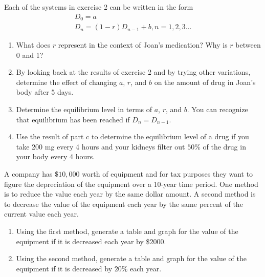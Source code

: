 \documentclass[10pt,]{book}
\theoremstyle{ptxdefinitionnotitle}
\theoremstyle{ptxdefinitiontitle}
\theoremstyle{ptxdefinitionnotitle}
\theoremstyle{ptxdefinitiontitle}
\theoremstyle{ptxdefinitionnotitle}
\theoremstyle{ptxdefinitiontitle}
\numberwithin{equation}{section}
\begin{document}
\begin{divisionexercise}{3}\hypertarget{exercise-5}{}
\hypertarget{p-23}{}%
Each of the systems in exercise 2 can be written in the form%
\begin{gather*}
D_0=a\\
D_n=(1-r) D_{n-1}+b, n=1,2,3...
\end{gather*}
\leavevmode%
\begin{enumerate}[label=(\alph*)]
\item\hypertarget{li-15}{}What does \(r\) represent in the context of Joan's medication?  Why is \(r\) between 0 and 1?%
\item\hypertarget{li-16}{}By looking back at the results of exercise 2 and by trying other variations, determine the effect of changing \(a\), \(r\), and \(b\) on the amount of drug in Joan's body after 5 days.%
\item\hypertarget{li-17}{}Determine the equilibrium level in terms of \(a\), \(r\), and \(b\).  You can recognize that equilibrium has been reached if  \(D_n=D_{n-1}\).%
\item\hypertarget{li-18}{}Use the result of part c to determine the equilibrium level of a drug if you take 200 mg every 4 hours and your kidneys filter out \(50\%\) of the drug in your body every 4 hours.%
\end{enumerate}
%
\end{divisionexercise}%
\begin{divisionexercise}{4}\hypertarget{exercise-6}{}
\hypertarget{p-24}{}%
A company has \(\$10,000\) worth of equipment and for tax purposes they want to figure the depreciation of the equipment over a 10-year time period.  One method is to reduce the value each year by the same dollar amount.  A second method is to decrease the value of the equipment each year by the same percent of the current value each year. \leavevmode%
\begin{enumerate}[label=(\alph*)]
\item\hypertarget{li-19}{}Using the first method, generate a table and graph for the value of the equipment if it is  decreased each year by \(\$2000\).%
\item\hypertarget{li-20}{}Using the second method, generate a table and graph for the value of the equipment if it is decreased by \(20\%\) each year.%
\end{enumerate}
%
\end{divisionexercise}%
\end{document}
